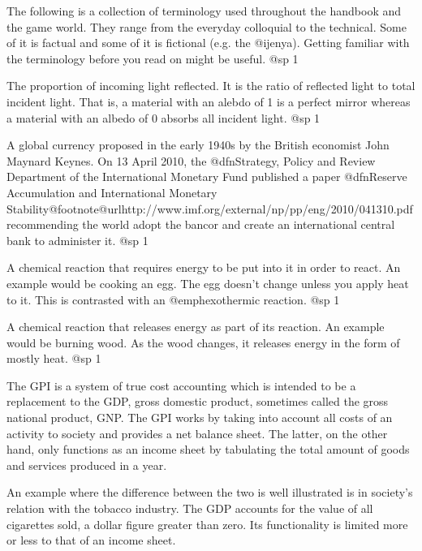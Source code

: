 
The following is a collection of terminology used throughout the handbook and the game world. They range from the everyday colloquial to the technical. Some of it is factual and some of it is fictional (e.g. the @i{jenya}). Getting familiar with the terminology before you read on might be useful.
@sp 1

The proportion of incoming light reflected. It is the ratio of reflected light to total incident light. That is, a material with an alebdo of 1 is a perfect mirror whereas a material with an albedo of 0 absorbs all incident light.
@sp 1

A global currency proposed in the early 1940s by the British economist John Maynard Keynes. On 13 April 2010, the @dfn{Strategy, Policy and Review Department of the International Monetary Fund} published a paper @dfn{Reserve Accumulation and International Monetary Stability}@footnote{@url{http://www.imf.org/external/np/pp/eng/2010/041310.pdf}} recommending the world adopt the bancor and create an international central bank to administer it.
@sp 1

A chemical reaction that requires energy to be put into it in order to react. An example would be cooking an egg. The egg doesn't change unless you apply heat to it. This is contrasted with an @emph{exothermic reaction}.
@sp 1

A chemical reaction that releases energy as part of its reaction. An example would be burning wood. As the wood changes, it releases energy in the form of mostly heat.
@sp 1

The GPI is a system of true cost accounting which is intended to be a replacement to the GDP, gross domestic product, sometimes called the gross national product, GNP. The GPI works by taking into account all costs of an activity to society and provides a net balance sheet. The latter, on the other hand, only functions as an income sheet by tabulating the total amount of goods and services produced in a year. 

An example where the difference between the two is well illustrated is in society's relation with the tobacco industry. The GDP accounts for the value of all cigarettes sold, a dollar figure greater than zero. Its functionality is limited more or less to that of an income sheet.

